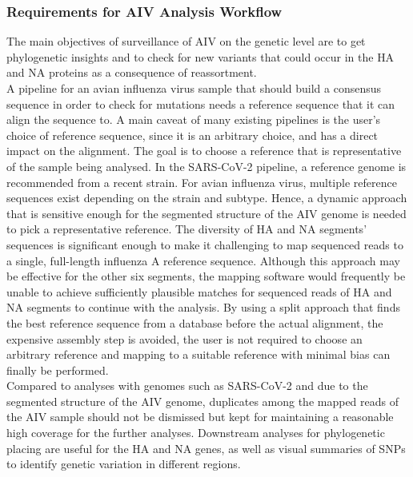 \subsubsection{Requirements for AIV Analysis Workflow}
The main objectives of surveillance of \ac{AIV} on the genetic level are to get phylogenetic insights and to check for new variants that could occur in the \ac{HA} and \ac{NA} proteins as a consequence of reassortment. \\
A pipeline for an avian influenza virus sample that should build a consensus sequence in order to check for mutations needs a reference sequence that it can align the sequence to. A main caveat of many existing pipelines is the user's choice of reference sequence, since it is an arbitrary choice, and has a direct impact on the alignment. The goal is to choose a reference that is representative of the sample being analysed. In the \ac{SARS-CoV-2} pipeline, a reference genome is recommended from a recent strain. For avian influenza virus, multiple reference sequences exist depending on the strain and subtype. Hence, a dynamic approach that is sensitive enough for the segmented structure of the \ac{AIV} genome is needed to pick a representative reference. The diversity of \ac{HA} and \ac{NA} segments' sequences is significant enough to make it challenging to map sequenced reads to a single, full-length influenza A reference sequence. Although this approach may be effective for the other six segments, the mapping software would frequently be unable to achieve sufficiently plausible matches for sequenced reads of \ac{HA} and \ac{NA} segments to continue with the analysis. By using a split approach that finds the best reference sequence from a database before the actual alignment, the expensive assembly step is avoided, the user is not required to choose an arbitrary reference and mapping to a suitable reference with minimal bias can finally be performed. \\
Compared to analyses with genomes such as \ac{SARS-CoV-2} and due to the segmented structure of the \ac{AIV} genome, duplicates among the mapped reads of the \ac{AIV} sample should not be dismissed but kept for maintaining a reasonable high coverage for the further analyses. Downstream analyses for phylogenetic placing are useful for the \ac{HA} and \ac{NA} genes, as well as visual summaries of \acp{SNP} to identify genetic variation in different regions.


